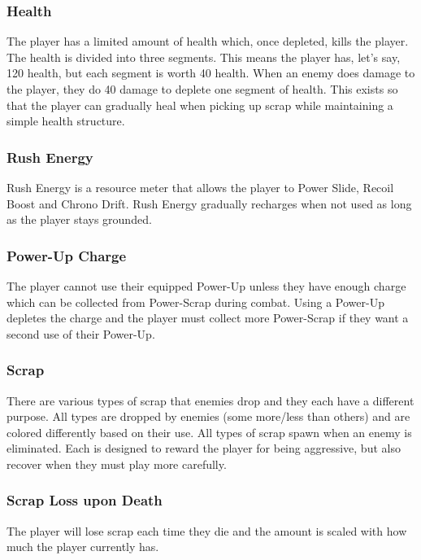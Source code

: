 \documentclass[12pt]{article}
\begin{document}
\subsubsection{Health}

The player has a limited amount of health which, once depleted, kills the player. The health is divided into three segments. This means the player has, let's say, 120 health, but each segment is worth 40 health. When an enemy does damage to the player, they do 40 damage to deplete one segment of health. This exists so that the player can gradually heal when picking up scrap while maintaining a simple health structure. 

\subsubsection{Rush Energy}

Rush Energy is a resource meter that allows the player to Power Slide, Recoil Boost and Chrono Drift. Rush Energy gradually recharges when not used as long as the player stays grounded. 

\subsubsection{Power-Up Charge}

The player cannot use their equipped Power-Up unless they have enough charge which can be collected from Power-Scrap during combat. Using a Power-Up depletes the charge and the player must collect more Power-Scrap if they want a second use of their Power-Up. 

\subsubsection{Scrap}

There are various types of scrap that enemies drop and they each have a different purpose. All types are dropped by enemies (some more/less than others) and are colored differently based on their use. All types of scrap spawn when an enemy is eliminated. Each is designed to reward the player for being aggressive, but also recover when they must play more carefully. 

\subsubsection{Scrap Loss upon Death}

The player will lose scrap each time they die and the amount is scaled with how much the player currently has. 
\end{document}
